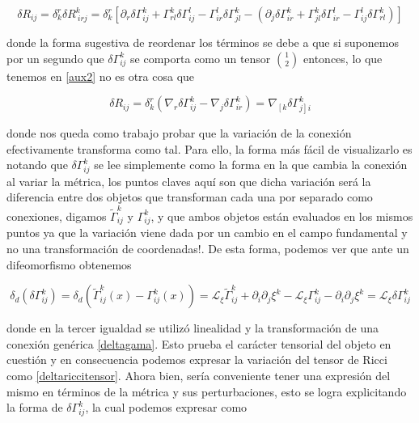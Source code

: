 \documentclass{article}
\numberwithin{equation}{section}
\begin{document}
\begin{equation}\label{aux2}
\delta R_{ij} = \delta^{r}_{k} \delta R^{k}_{ \ i r j} = \delta^{r}_{k}  \left[ \partial_r \delta\Gamma^{k}_{i j} + \Gamma^{k}_{ r l}\delta \Gamma^l_{i j }  - \Gamma^l_{i r } \delta  \Gamma^{k}_{ j l} - \left( \partial_j \delta\Gamma^{k}_{i r} + \Gamma^{k}_{ j l} \delta \Gamma^l_{i r } - \Gamma^l_{i j } \delta  \Gamma^{k}_{ r l}  \right) \right]
\end{equation}
 
donde la forma sugestiva de reordenar los términos se debe a que si suponemos por un segundo que $ \delta \Gamma^{k}_{i j}  $ se comporta como un tensor $ \binom{1}{2} $ entonces, lo que tenemos en \ref{aux2} no es otra cosa que
 
\begin{equation}\label{deltariccitensor}
\delta R_{ij}= \delta^{r}_{k} \left( \nabla_{r} \delta \Gamma^{k}_{i j} - \nabla_{j} \delta \Gamma^{k}_{i r}\right) = \nabla_{\left[ k \right.} \delta \Gamma^{k}_{\left. j \right] i}
\end{equation}
 
donde nos queda como trabajo probar que la variación de la conexión efectivamente transforma como tal. Para ello, la forma más fácil de visualizarlo es notando que  $ \delta \Gamma^{k}_{i j}  $ se lee simplemente como la forma en la que cambia la conexión al variar la métrica, los puntos claves aquí son que dicha variación será la diferencia entre dos objetos que transforman cada una por separado como conexiones, digamos $\tilde{\Gamma}^{k}_{i j} $ y  $ \Gamma^{k}_{i j}  $, y que ambos objetos están evaluados en los mismos puntos ya que la variación viene dada por un cambio en el campo fundamental y no una transformación de coordenadas!. De esta forma, podemos ver que ante un difeomorfismo obtenemos

\begin{equation*}
\delta_d \left( \delta\Gamma^{k}_{i j} \right) = \delta_d \left( \tilde{\Gamma}^{k}_{i j}(x) - {\Gamma}^{k}_{i j} (x)\right)  = \mathcal{L}_{\xi} \tilde{\Gamma}^{k}_{i j}  + \partial_i \partial_j \xi^k - \mathcal{L}_{\xi} \Gamma^{k}_{i j}  - \partial_i \partial_j \xi^k = \mathcal{L}_{\xi}\delta\Gamma^{k}_{i j}
\end{equation*}

donde en la tercer igualdad se utilizó linealidad y la transformación de una conexión genérica \ref{deltagama}. Esto prueba el carácter tensorial del objeto en cuestión y en consecuencia podemos expresar la variación del tensor de Ricci como \ref{deltariccitensor}. Ahora bien, sería conveniente tener una expresión del mismo en términos de la métrica y sus perturbaciones, esto se logra explicitando la forma de $ \delta \Gamma^{k}_{i j}  $, la cual podemos expresar como
\end{document}
